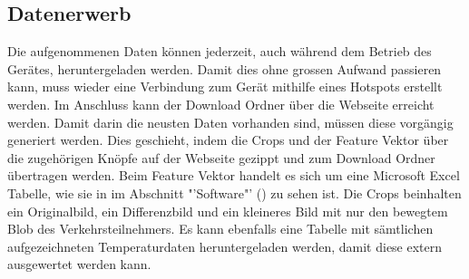 \subsection{Datenerwerb}
Die aufgenommenen Daten können jederzeit, auch während dem Betrieb des Gerätes, heruntergeladen werden. Damit dies ohne grossen Aufwand passieren kann, muss wieder eine Verbindung zum Gerät mithilfe eines Hotspots erstellt werden. Im Anschluss kann der Download Ordner über die Webseite erreicht werden. Damit darin die neusten Daten vorhanden sind, müssen diese vorgängig generiert werden. Dies geschieht, indem die Crops und der Feature Vektor über die zugehörigen Knöpfe auf der Webseite gezippt und zum Download Ordner übertragen werden. Beim Feature Vektor handelt es sich um eine Microsoft Excel Tabelle, wie sie in im Abschnitt "'Software"' () zu sehen ist. Die Crops beinhalten ein Originalbild, ein Differenzbild und ein kleineres Bild mit nur den bewegtem Blob des Verkehrsteilnehmers. Es kann ebenfalls eine Tabelle mit sämtlichen aufgezeichneten Temperaturdaten heruntergeladen werden, damit diese extern ausgewertet werden kann.